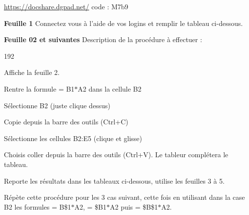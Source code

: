 \documentclass[main.tex]{subfiles}
\begin{document}
\begin{problem} \hfill \url{https://docshare.dgpad.net/} code : M7b9  

\textbf{Feuille 1}	 Connectez vous à l'aide de vos logins et remplir le tableau ci-dessous.


	\textbf{Feuille 02 et suivantes}
	Description de la procédure à effectuer :
	\begin{dingautolist}{192}
		\item Affiche la feuille 2.
		\item Rentre la formule { \helvbx = B1$*$A2} dans la cellule {\helvbx B2}
		\item Sélectionne {\helvbx B2} (juste clique dessus)
		\item Copie depuis la barre des outils (Ctrl+C)
		\item Sélectionne les cellules { \helvbx B2:E5}  (clique et glisse)
		\item Choisis \og coller \fg{} depuis la barre des outils (Ctrl+V). Le tableur complétera le tableau.
		\item Reporte les résultats dans les tableaux ci-dessous, utilise les feuilles 3 à 5. 
		\item Répète cette procédure pour les 3 cas suivant, cette fois en utilisant dans la case {\helvbx B2} les formules { \helvbx = B\$1$*$A2},  { \helvbx = \$B1$*$A2} puis  { \helvbx = \$B\$1$*$A2}. 
	\end{dingautolist}
	
	

\end{problem}
\end{document}
